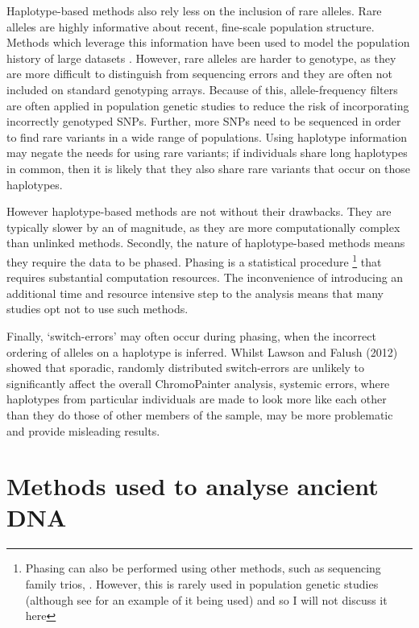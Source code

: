 Haplotype-based methods also rely less on the inclusion of rare alleles. Rare alleles are highly informative about recent, fine-scale population structure. Methods which leverage this information have been used to model the population history of large datasets \cite{schiffels2016iron, gravel2011demographic, o2015rare}. However, rare alleles are harder to genotype, as they are more difficult to distinguish from sequencing errors and they are often not included on standard genotyping arrays. Because of this, allele-frequency filters are often applied in population genetic studies to reduce the risk of incorporating incorrectly genotyped SNPs. Further, more SNPs need to be sequenced in order to find rare variants in a wide range of populations. Using haplotype information may negate the needs for using rare variants; if individuals share long haplotypes in common, then it is likely that they also share rare variants that occur on those haplotypes. 

However haplotype-based methods are not without their drawbacks. They are typically slower by an of magnitude, as they are more computationally complex than unlinked methods. Secondly, the nature of haplotype-based methods means they require the data to be phased. Phasing is a statistical procedure \footnote{Phasing can also be performed using other methods, such as sequencing family trios, . However, this is rarely used in population genetic studies (although see \cite{BergstromHGDP} for an example of it being used) and so I will not discuss it here} that requires substantial computation resources. The inconvenience of introducing an additional time and resource intensive step to the analysis means that many studies opt not to use such methods. 

Finally, `switch-errors' may often occur during phasing, when the incorrect ordering of alleles on a haplotype is inferred. Whilst Lawson and Falush (2012) showed that sporadic, randomly distributed switch-errors are unlikely to significantly affect the overall ChromoPainter analysis, systemic errors, where haplotypes from particular individuals are made to look more like each other than they do those of other members of the sample, may be more problematic and provide misleading results\cite{LawsonFalushReview}. 

\section{Methods used to analyse ancient DNA}

